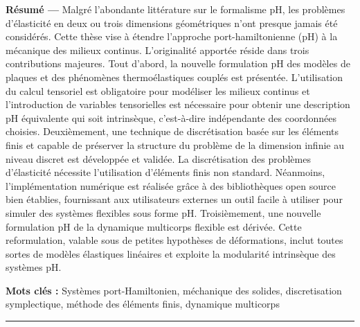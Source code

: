 \begin{vcenterpage}
\thispagestyle{empty}
{\large\textbf{Résumé ---}}
 Malgré l'abondante littérature sur le formalisme pH, les problèmes d'élasticité en deux ou trois dimensions géométriques n'ont presque jamais été considérés. Cette thèse vise à étendre l'approche port-hamiltonienne (pH) à la mécanique des milieux continus. L'originalité apportée réside dans trois contributions majeures. Tout d'abord, la nouvelle formulation pH des modèles de plaques et des phénomènes thermoélastiques couplés est présentée. L'utilisation du calcul tensoriel est obligatoire pour modéliser les milieux  continus et l'introduction de variables tensorielles est nécessaire pour obtenir une description pH équivalente qui soit intrinsèque, c'est-à-dire indépendante des coordonnées choisies. Deuxièmement, une technique de discrétisation basée sur les éléments finis et capable de préserver la structure du problème de la dimension infinie au niveau discret est développée et validée. La discrétisation des problèmes d'élasticité nécessite l'utilisation d'éléments finis non standard. Néanmoins, l'implémentation numérique est réalisée grâce à des bibliothèques open source bien établies, fournissant aux utilisateurs externes un outil facile à utiliser pour simuler des systèmes flexibles sous forme pH. Troisièmement, une nouvelle formulation pH de la dynamique multicorps flexible est dérivée. Cette reformulation, valable sous de petites hypothèses de déformations, inclut toutes sortes de modèles élastiques linéaires et exploite la modularité intrinsèque des systèmes pH.

{\large\textbf{Mots clés :}}
    Systèmes port-Hamiltonien, méchanique des solides, discretisation symplectique, méthode des éléments finis, dynamique multicorps
\\
\noindent\rule[2pt]{\textwidth}{0.5pt}



\end{vcenterpage}
